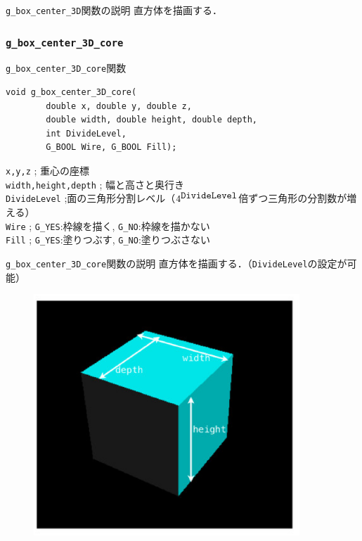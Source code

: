 \documentclass[platex,a4paper,12pt]{jsarticle}%
\begin{document}
\begin{itembox}[l]{\texttt{g\_box\_center\_3D}関数の説明}
直方体を描画する．
\end{itembox}

\subsubsection{\texttt{g\_box\_center\_3D\_core}}

\begin{itembox}[l]{\texttt{g\_box\_center\_3D\_core}関数}
\begin{verbatim}
void g_box_center_3D_core(
        double x, double y, double z,
        double width, double height, double depth,
        int DivideLevel,
        G_BOOL Wire, G_BOOL Fill);   
\end{verbatim}
\verb|x,y,z| ; 重心の座標\\
\verb|width,height,depth| ; 幅と高さと奥行き\\
\verb|DivideLevel| ;面の三角形分割レベル（$4^{\verb|DivideLevel|}$倍ずつ三角形の分割数が増える）\\
\verb|Wire| ; \verb|G_YES|:枠線を描く, \verb|G_NO|:枠線を描かない \\
\verb|Fill| ; \verb|G_YES|:塗りつぶす, \verb|G_NO|:塗りつぶさない
\end{itembox}

\begin{itembox}[l]{\texttt{g\_box\_center\_3D\_core}関数の説明}
直方体を描画する．（\verb|DivideLevel|の設定が可能）
\end{itembox}
\begin{figure}[htb]
\centering
\includegraphics[width=100mm]{Canvas_g_box.eps}
\end{figure}
\end{document}
